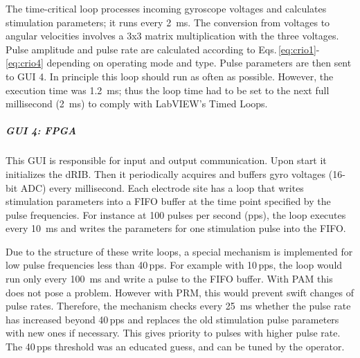 	The time-critical loop processes incoming gyroscope voltages and calculates stimulation parameters; it runs every \SI{2}{\milli\second}. The conversion from voltages to angular velocities involves a 3x3 matrix multiplication with the three voltages. Pulse amplitude and pulse rate are calculated according to Eqs.\,\eqref{eq:crio1}-\eqref{eq:crio4} depending on operating mode and type. Pulse parameters are then sent to GUI 4. In principle this loop should run as often as possible. However, the execution time was \SI{1.2}{\milli\second}; thus the loop time had to be set to the next full millisecond (\SI{2}{\milli\second}) to comply with LabVIEW’s Timed Loops.

\subparagraph{GUI 4: FPGA}
This GUI is responsible for input and output communication. Upon start it initializes the dRIB. Then it periodically acquires and buffers gyro voltages (16-bit ADC) every millisecond. Each electrode site has a loop that writes stimulation parameters into a FIFO buffer at the time point specified by the pulse frequencies. For instance at 100 pulses per second (pps), the loop executes every \SI{10}{\milli\second} and writes the parameters for one stimulation pulse into the FIFO.

Due to the structure of these write loops, a special mechanism is implemented for low pulse frequencies less than 40\,pps. For example with 10\,pps, the loop would run only every \SI{100} {\milli\second} and write a pulse to the FIFO buffer. With PAM this does not pose a problem. However with PRM, this would prevent swift changes of pulse rates. Therefore, the mechanism checks every \SI{25}{\milli\second} whether the pulse rate has increased beyond 40\,pps and replaces the old stimulation pulse parameters with new ones if necessary. This gives priority to pulses with higher pulse rate. The 40\,pps threshold was an educated guess, and can be tuned by the operator.

